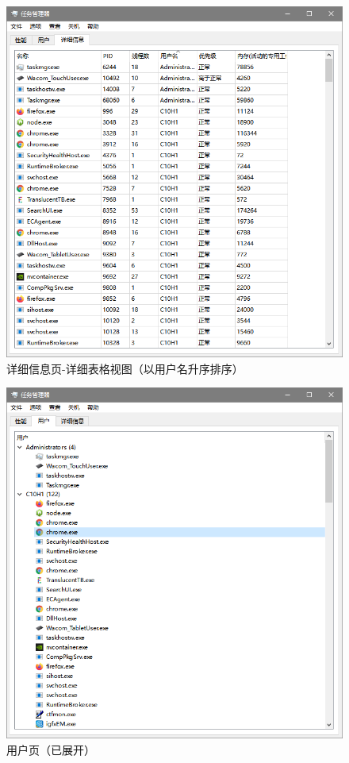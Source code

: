 \documentclass[UTF8,twoside,titlepage]{ctexart}
\begin{document}
\begin{figure}[htb]
    \centering
    \includegraphics[scale=0.75]{../media/tabs/detailTab/listView/listview.png}
    \caption{详细信息页-详细表格视图（以用户名升序排序）}
    \label{fig:detailtab}
\end{figure}

\begin{figure}[htb]
    \centering
    \includegraphics[scale=0.75]{../media/tabs/userTab/usertab expanded.png}
    \caption{用户页（已展开）}
    \label{fig:usertab}
\end{figure}
\end{document}
